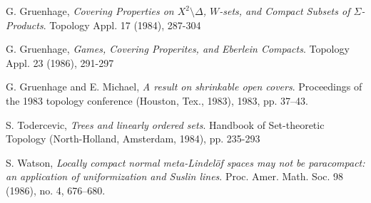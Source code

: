 \begin{thebibliography}{9}

  G. Gruenhage,
  \emph{Covering Properties on $X^2\setminus\Delta$, $W$-sets, and Compact Subsets of $\Sigma$-Products}.
  Topology Appl. 17 (1984), 287-304

  G. Gruenhage,
  \emph{Games, Covering Properites, and Eberlein Compacts}.
  Topology Appl. 23 (1986), 291-297

  G. Gruenhage and E. Michael, 
  \emph{A result on shrinkable open covers}.
  Proceedings of the 1983 topology conference (Houston, Tex., 1983), 1983, pp. 37–43.

  S. Todercevic,
  \emph{Trees and linearly ordered sets}.
  Handbook of Set-theoretic Topology (North-Holland, Amsterdam, 1984), pp. 235-293

  S. Watson,
  \emph{Locally compact normal meta-Lindel\"of spaces may not be paracompact: 
  an application of uniformization and Suslin lines}. 
  Proc. Amer. Math. Soc. 98 (1986), no. 4, 676–680.

\end{thebibliography}













